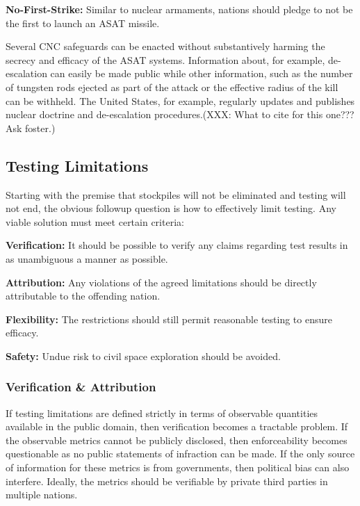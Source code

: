 \textbf{No-First-Strike:} Similar to nuclear armaments, nations should
pledge to not be the first to launch an ASAT missile.

Several CNC safeguards can be enacted without substantively harming
the secrecy and efficacy of the ASAT systems.  Information about, for
example, de-escalation can easily be made public while other
information, such as the number of tungsten rods ejected as part of
the attack or the effective radius of the kill can be withheld.  The
United States, for example, regularly updates and publishes nuclear
doctrine and de-escalation procedures.(XXX: What to cite for this
one??? Ask foster.)

\subsection{Testing Limitations}
Starting with the premise that stockpiles will not be eliminated and
testing will not end, the obvious followup question is how to
effectively limit testing.  Any viable solution must meet certain
criteria:

\textbf{Verification:} It should be possible to verify any claims
regarding test results in as unambiguous a manner as possible.

\textbf{Attribution:} Any violations of the agreed limitations should
be directly attributable to the offending nation.

\textbf{Flexibility:} The restrictions should still permit reasonable
testing to ensure efficacy.

\textbf{Safety:} Undue risk to civil space exploration should be
avoided.

\subsubsection{Verification \& Attribution}
If testing limitations are defined strictly in terms of observable
quantities available in the public domain, then verification becomes a
tractable problem.  If the observable metrics cannot be publicly
disclosed, then enforceability becomes questionable as no public
statements of infraction can be made.  If the only source of
information for these metrics is from governments, then political bias
can also interfere.  Ideally, the metrics should be verifiable by
private third parties in multiple nations.

\def\derX{{\bf x}}

